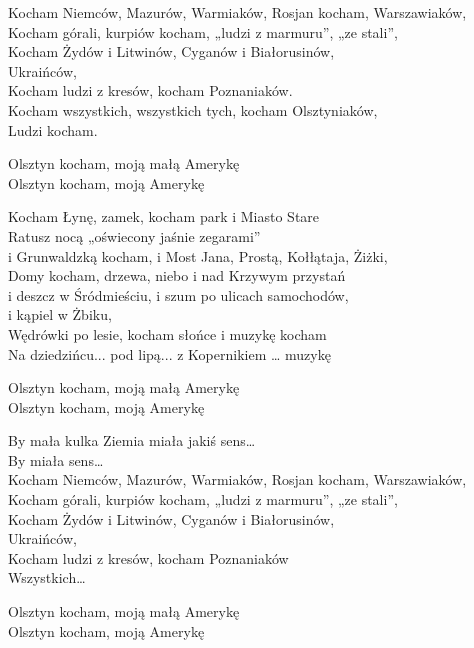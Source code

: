 \begin{text}
    \footnotesize{
    Kocham Niemców, Mazurów, Warmiaków, Rosjan kocham, Warszawiaków,\\
    Kocham górali, kurpiów kocham, „ludzi z marmuru”, „ze stali”,\\
    Kocham Żydów i Litwinów, Cyganów i Białorusinów,\\
    Ukraińców,\\
    Kocham ludzi z kresów, kocham Poznaniaków.\\
    Kocham wszystkich, wszystkich tych, kocham Olsztyniaków,\\
    Ludzi kocham.

    Olsztyn kocham, moją małą Amerykę\\
    Olsztyn kocham, moją Amerykę

    Kocham Łynę, zamek, kocham park i Miasto Stare\\
    Ratusz nocą „oświecony jaśnie zegarami”\\
    i Grunwaldzką kocham, i Most Jana, Prostą, Kołłątaja, Żiżki,\\
    Domy kocham, drzewa, niebo i nad Krzywym przystań\\
    i deszcz w Śródmieściu, i szum po ulicach samochodów,\\
    i kąpiel w Żbiku,\\
    Wędrówki po lesie, kocham słońce i muzykę kocham\\
    Na dziedzińcu... pod lipą... z Kopernikiem … muzykę

    Olsztyn kocham, moją małą Amerykę\\
    Olsztyn kocham, moją Amerykę

    By mała kulka Ziemia miała jakiś sens…\\
    By miała sens…\\
    Kocham Niemców, Mazurów, Warmiaków, Rosjan kocham, Warszawiaków,\\
    Kocham górali, kurpiów kocham, „ludzi z marmuru”, „ze stali”,\\
    Kocham Żydów i Litwinów, Cyganów i Białorusinów,\\
    Ukraińców,\\
    Kocham ludzi z kresów, kocham Poznaniaków\\
    Wszystkich…

    Olsztyn kocham, moją małą Amerykę\\
    Olsztyn kocham, moją Amerykę
    }
\end{text}
\begin{chord}

\end{chord}